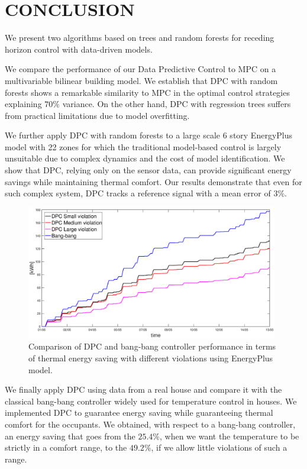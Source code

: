 \section{CONCLUSION}
\label{S:conclusion}

We present two algorithms based on trees and random forests for receding horizon control with data-driven models.

We compare the performance of our Data Predictive Control to MPC on a multivariable bilinear building model. We establish that DPC with random forests shows a remarkable similarity to MPC in the optimal control strategies explaining $70\%$ variance. On the other hand, DPC with regression trees suffers from practical limitations due to model overfitting.

We further apply DPC with random forests to a large scale 6 story EnergyPlus model with 22 zones for which the traditional model-based control is largely unsuitable due to complex dynamics and the cost of model identification. We show that DPC, relying only on the sensor data, can provide significant energy savings while maintaining thermal comfort. Our results demonstrate that even for such complex system, DPC tracks a reference signal with a mean error of $3\%$.

\begin{figure}[t!]
	\begin{center}
		\includegraphics[width=26pc]{figures/Energy_all_EnergyPlus.eps}
	\end{center}
	\caption{Comparison of DPC and bang-bang controller performance in terms of thermal energy saving with different violations using EnergyPlus model.}
	\label{F:comparison_all_energy_E+}
\end{figure}

We finally apply DPC using data from a real house and compare it with the classical bang-bang controller widely used for temperature control in houses. We implemented DPC to guarantee energy saving while guaranteeing thermal comfort for the occupants. We obtained, with respect to a bang-bang controller, an energy saving that goes from the $25.4\%$, when we want the temperature to be strictly in a comfort range, to the $49.2\%$, if we allow little violations of such a range.

